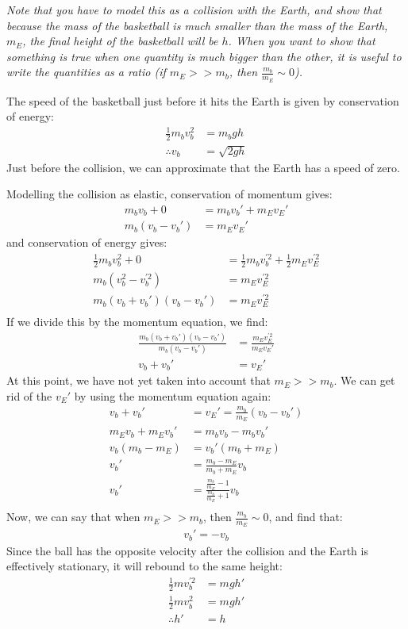 \textit{Note that you have to model this as a collision with the Earth, and show that because the mass of the basketball is much smaller than the mass of the Earth, $m_E$, the final height of the basketball will be $h$. When you want to show that something is true when one quantity is much bigger than the other, it is useful to write the quantities as a ratio (if $m_E>>m_b$, then $\frac{m_b}{m_E}\sim 0$).}
\begin{solution}
The speed of the basketball just before it hits the Earth is given by conservation of energy:
\begin{align*}
\frac{1}{2}m_bv_b^2&=m_bgh\\
\therefore v_b &=\sqrt{2gh}
\end{align*}
Just before the collision, we can approximate that the Earth has a speed of zero.

Modelling the collision as elastic, conservation of momentum gives:
\begin{align*}
m_bv_b+0&=m_bv_b'+m_Ev_E'\\
m_b(v_b-v_b')&=m_Ev_E'
\end{align*}
and conservation of energy gives:
\begin{align*}
\frac{1}{2}m_bv_b^2 + 0 &= \frac{1}{2}m_bv_b^{'2}+\frac{1}{2}m_Ev_E^{'2}\\
m_b(v_b^2-v_b^{'2}) &=m_Ev_E^{'2}\\
m_b(v_b+v_b') (v_b-v_b')&=m_Ev_E^{'2}\\
\end{align*}
If we divide this by the momentum equation, we find:
\begin{align*}
\frac{m_b(v_b+v_b') (v_b-v_b')}{m_b(v_b-v_b')}&=\frac{m_Ev_E^{'2}}{m_Ev_E'}\\
v_b+v_b' &=v_E'
\end{align*}
At this point, we have not yet taken into account that $m_E >>m_b$. We can get rid of the $v_E'$ by using the momentum equation again:
\begin{align*}
v_b+v_b' &=v_E'=\frac{m_b}{m_E}(v_b-v_b')\\
m_Ev_b+m_Ev_b'&=m_bv_b-m_bv_b'\\
v_b(m_b-m_E)&=v_b'(m_b+m_E)\\
v_b' &=\frac{m_b-m_E}{m_b+m_E}v_b\\
v_b' &=\frac{\frac{m_b}{m_E}-1}{\frac{m_b}{m_E}+1}v_b\\
\end{align*}
Now, we can say that when $m_E>>m_b$, then $\frac{m_b}{m_E} \sim 0$, and find that:
\begin{align*}
v_b' = -v_b
\end{align*}
Since the ball has the opposite velocity after the collision and the Earth is effectively stationary, it will rebound to the same height:
\begin{align*}
\frac{1}{2}mv_b^{'2}&=mgh'\\
\frac{1}{2}mv_b^{2}&=mgh'\\
\therefore h' &= h
\end{align*}
\end{solution}



